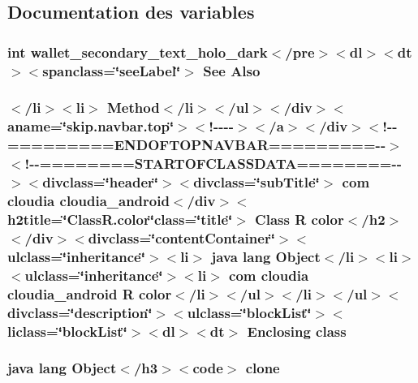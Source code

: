 \subsection{Documentation des variables}
\hypertarget{_r_8color_8html_a588a0be9383aa4411f9394ee35b42a42}{
\subsubsection[{Also}]{\setlength{\rightskip}{0pt plus 5cm}int wallet\-\_\-secondary\-\_\-text\-\_\-holo\-\_\-dark$<$/pre$>$$<$dl$>$$<${\bf dt}$>$$<$spanclass=\char`\"{}see\-Label\char`\"{}$>$ See Also}}\label{_r_8color_8html_a588a0be9383aa4411f9394ee35b42a42}
\hypertarget{_r_8color_8html_a16e32066c7370a6301ecb20f000af222}{
\subsubsection[{class}]{\setlength{\rightskip}{0pt plus 5cm}$<$/li$>$$<$li$>$ Method$<$/li$>$$<$/ul$>$$<$/div$>$$<$aname=\char`\"{}skip.\-navbar.\-top\char`\"{}$>$$<$!-\/-\/-\/-\/$>$$<$/a$>$$<$/div$>$$<$!-\/-\/=========E\-N\-D\-O\-F\-T\-O\-P\-N\-A\-V\-B\-A\-R=========-\/-\/$>$$<$!-\/-\/========S\-T\-A\-R\-T\-O\-F\-C\-L\-A\-S\-S\-D\-A\-T\-A========-\/-\/$>$$<$divclass=\char`\"{}header\char`\"{}$>$$<$divclass=\char`\"{}sub\-Title\char`\"{}$>$ com cloudia cloudia\-\_\-android$<$/div$>$$<$h2title=\char`\"{}Class\-R.\-color\char`\"{}class=\char`\"{}title\char`\"{}$>$ Class {\bf R} {\bf color}$<$/h2$>$$<$/div$>$$<$divclass=\char`\"{}content\-Container\char`\"{}$>$$<$ulclass=\char`\"{}inheritance\char`\"{}$>$$<$li$>$ java lang Object$<$/li$>$$<$li$>$$<$ulclass=\char`\"{}inheritance\char`\"{}$>$$<$li$>$ com cloudia cloudia\-\_\-android {\bf R} {\bf color}$<$/li$>$$<$/ul$>$$<$/li$>$$<$/ul$>$$<$divclass=\char`\"{}description\char`\"{}$>$$<$ulclass=\char`\"{}block\-List\char`\"{}$>$$<$liclass=\char`\"{}block\-List\char`\"{}$>$$<$dl$>$$<${\bf dt}$>$ Enclosing class}}\label{_r_8color_8html_a16e32066c7370a6301ecb20f000af222}
\hypertarget{_r_8color_8html_adc9607fcabf6f2d7f401ad52015ef6e0}{
\subsubsection[{clone}]{\setlength{\rightskip}{0pt plus 5cm}java lang Object$<$/h3$>$$<$code$>$ clone}}\label{_r_8color_8html_adc9607fcabf6f2d7f401ad52015ef6e0}
